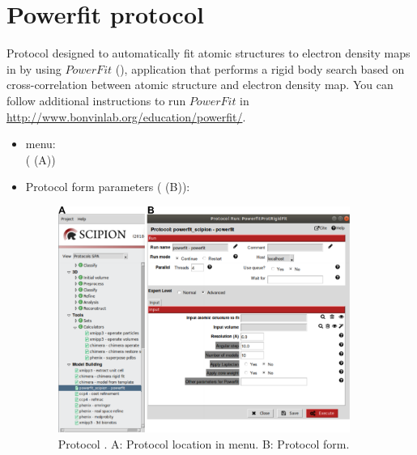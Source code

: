 \section{Powerfit protocol}
\label{app:powerfitProtocol}%
Protocol designed to automatically fit atomic structures to electron density maps in \scipion by using $PowerFit$ (\citep{vanzundert2016}), application that performs a rigid body search based on cross-correlation between atomic structure and electron density map. You can follow additional instructions to run $PowerFit$ in \url{http://www.bonvinlab.org/education/powerfit/}.\\

   
 \begin{itemize}
  \item \scipion menu:\\
    ( (A))\\
  
  \item Protocol form parameters ( (B)):\\
  
    \begin{figure}[H]
     \centering 
     \captionsetup{width=.7\linewidth} 
     \includegraphics[width=0.90\textwidth]{Images_appendix/Fig113.pdf}
     \caption{Protocol . A: Protocol location in \scipion menu. B: Protocol form.}
     \label{fig:app_protocol_powerfit_1}
    \end{figure}


\end{itemize}

